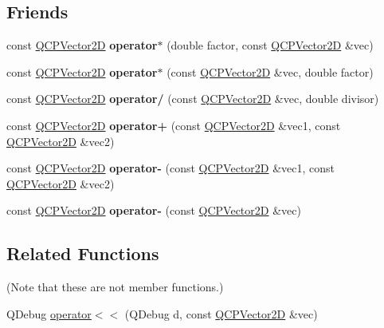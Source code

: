 \subsection*{Friends}
\begin{DoxyCompactItemize}
\item 
\mbox{\label{class_q_c_p_vector2_d_aa75268fb64b9eaee5448fb815007bee9}} 
const \hyperlink{class_q_c_p_vector2_d}{Q\+C\+P\+Vector2D} {\bfseries operator$\ast$} (double factor, const \hyperlink{class_q_c_p_vector2_d}{Q\+C\+P\+Vector2D} \&vec)
\item 
\mbox{\label{class_q_c_p_vector2_d_aace10d28a76e84e7380ede1a9cb58274}} 
const \hyperlink{class_q_c_p_vector2_d}{Q\+C\+P\+Vector2D} {\bfseries operator$\ast$} (const \hyperlink{class_q_c_p_vector2_d}{Q\+C\+P\+Vector2D} \&vec, double factor)
\item 
\mbox{\label{class_q_c_p_vector2_d_aa69909afc8c656999a2ea292ea01244b}} 
const \hyperlink{class_q_c_p_vector2_d}{Q\+C\+P\+Vector2D} {\bfseries operator/} (const \hyperlink{class_q_c_p_vector2_d}{Q\+C\+P\+Vector2D} \&vec, double divisor)
\item 
\mbox{\label{class_q_c_p_vector2_d_a24cc5985429b12dbed4d0d3c5a917d20}} 
const \hyperlink{class_q_c_p_vector2_d}{Q\+C\+P\+Vector2D} {\bfseries operator+} (const \hyperlink{class_q_c_p_vector2_d}{Q\+C\+P\+Vector2D} \&vec1, const \hyperlink{class_q_c_p_vector2_d}{Q\+C\+P\+Vector2D} \&vec2)
\item 
\mbox{\label{class_q_c_p_vector2_d_a9e01331d8debf0877ee4cba9abd83605}} 
const \hyperlink{class_q_c_p_vector2_d}{Q\+C\+P\+Vector2D} {\bfseries operator-\/} (const \hyperlink{class_q_c_p_vector2_d}{Q\+C\+P\+Vector2D} \&vec1, const \hyperlink{class_q_c_p_vector2_d}{Q\+C\+P\+Vector2D} \&vec2)
\item 
\mbox{\label{class_q_c_p_vector2_d_a14c807d345ee3f22d6809bb5a4137b52}} 
const \hyperlink{class_q_c_p_vector2_d}{Q\+C\+P\+Vector2D} {\bfseries operator-\/} (const \hyperlink{class_q_c_p_vector2_d}{Q\+C\+P\+Vector2D} \&vec)
\end{DoxyCompactItemize}
\subsection*{Related Functions}
(Note that these are not member functions.) \begin{DoxyCompactItemize}
\item 
Q\+Debug \hyperlink{class_q_c_p_vector2_d_a6c757af9671d925af4a36c2f58fb7234}{operator$<$$<$} (Q\+Debug d, const \hyperlink{class_q_c_p_vector2_d}{Q\+C\+P\+Vector2D} \&vec)
\end{DoxyCompactItemize}


